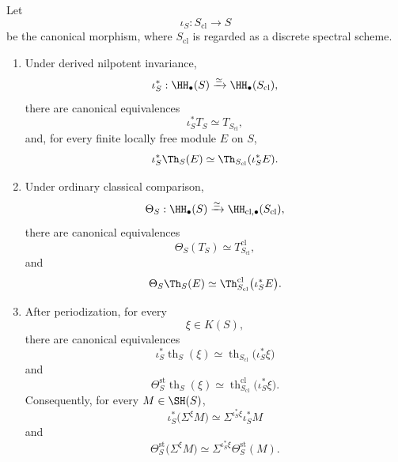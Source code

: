 \begin{proposition}
\label{prop:comparison-preserves-T}
Let
\[
    \iota_S:S_{\mathrm{cl}}\longrightarrow S
\]
be the canonical morphism, where \(S_{\mathrm{cl}}\) is regarded as a
discrete spectral scheme.

\begin{enumerate}
    \item Under derived nilpotent invariance,
    \[
        \iota_S^*:
        \HH_\bullet(S)
        \xrightarrow{\simeq}
        \HH_\bullet(S_{\mathrm{cl}}),
    \]
    there are canonical equivalences
    \[
        \iota_S^*T_S
        \simeq
        T_{S_{\mathrm{cl}}},
    \]
    and, for every finite locally free module \(E\) on \(S\),
    \[
        \iota_S^*\Th_S(E)
        \simeq
        \Th_{S_{\mathrm{cl}}}(\iota_S^*E).
    \]

    \item Under ordinary classical comparison,
    \[
        \Theta_S:
        \HH_\bullet(S)
        \xrightarrow{\simeq}
        \HH_{\mathrm{cl},\bullet}(S_{\mathrm{cl}}),
    \]
    there are canonical equivalences
    \[
        \Theta_S(T_S)
        \simeq
        T^{\mathrm{cl}}_{S_{\mathrm{cl}}},
    \]
    and
    \[
        \Theta_S\Th_S(E)
        \simeq
        \Th^{\mathrm{cl}}_{S_{\mathrm{cl}}}
        \bigl(
          \iota_S^*E
        \bigr).
    \]

    \item After periodization, for every
    \[
        \xi\in K(S),
    \]
    there are canonical equivalences
    \[
        \iota_S^*
        \operatorname{th}_S(\xi)
        \simeq
        \operatorname{th}_{S_{\mathrm{cl}}}
        \bigl(
          \iota_S^*\xi
        \bigr)
    \]
    and
    \[
        \Theta_S^{\mathrm{st}}
        \operatorname{th}_S(\xi)
        \simeq
        \operatorname{th}^{\mathrm{cl}}_{S_{\mathrm{cl}}}
        \bigl(
          \iota_S^*\xi
        \bigr).
    \]
    Consequently, for every \(M\in\SH(S)\),
    \[
        \iota_S^*
        \bigl(
          \Sigma^\xi M
        \bigr)
        \simeq
        \Sigma^{\iota_S^*\xi}
        \iota_S^*M
    \]
    and
    \[
        \Theta_S^{\mathrm{st}}
        \bigl(
          \Sigma^\xi M
        \bigr)
        \simeq
        \Sigma^{\iota_S^*\xi}
        \Theta_S^{\mathrm{st}}(M).
    \]
\end{enumerate}
\end{proposition}

